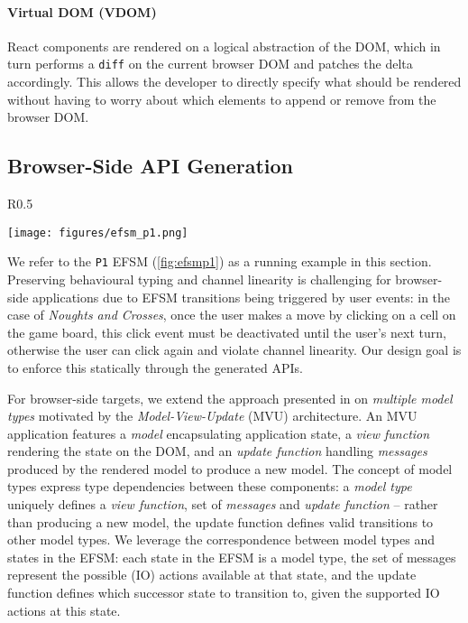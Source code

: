 
\paragraph{Virtual DOM (VDOM)}
React components are rendered on a logical
abstraction of the DOM, which in turn performs a \texttt{diff} on the current
browser DOM and patches the delta accordingly.
This allows the developer to
directly specify what should be rendered without having to worry about which
elements to append or remove from the browser DOM.

\subsection{Browser-Side API Generation}

\label{section:browser}

\begin{wrapfigure}{R}{0.5\textwidth}
  \begin{center}
    \texttt{[image: figures/efsm\_p1.png]}
  \end{center}

  \label{fig:efsmp1}
\end{wrapfigure}

We refer to the \texttt{P1} EFSM (\cref{fig:efsmp1}) as a running example in
this section.
Preserving behavioural typing and channel linearity is challenging
for browser-side applications due to EFSM transitions being triggered by user
events:
in the case of \textit{Noughts and Crosses}, once the user makes a move by
clicking on a cell on the game board, this click event must be deactivated
until the user's next turn, otherwise the user can click again and violate
channel linearity.
Our design goal is to enforce this statically through the generated APIs.

For browser-side targets, we extend the approach presented in \cite{MVU2019} on
\textit{multiple model types} motivated by the \textit{Model-View-Update} (MVU)
architecture.
An MVU application features a \textit{model} encapsulating application
state, a \textit{view function} rendering the state on the DOM, and an
\textit{update function} handling \textit{messages} produced by the
rendered model to produce a new model.
The concept of model types express type dependencies between these
components: a \emph{model type} uniquely defines a \textit{view function},
set of \textit{messages} and \textit{update function} -- rather than
producing a new model, the update function defines valid transitions to
other model types.
We leverage the correspondence between model types and states in the EFSM:
each state in the EFSM is a model type, the set of messages represent
the possible (IO) actions available at that state,
and the update function defines which successor state to transition to,
given the supported IO actions at this state.

